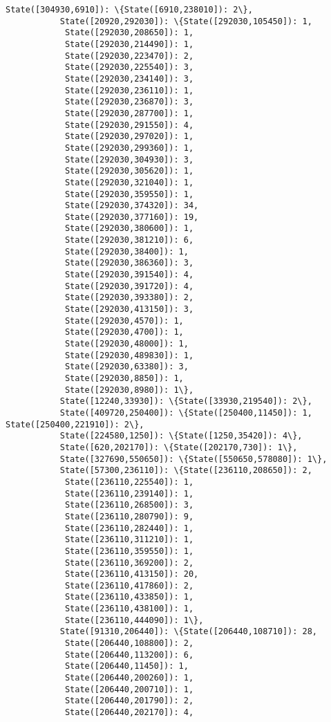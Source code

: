 \documentclass[11pt]{article}
\begin{document}
\begin{Verbatim}[commandchars=\\\{\}]
           State([304930,6910]): \{State([6910,238010]): 2\},
           State([20920,292030]): \{State([292030,105450]): 1,
            State([292030,208650]): 1,
            State([292030,214490]): 1,
            State([292030,223470]): 2,
            State([292030,225540]): 3,
            State([292030,234140]): 3,
            State([292030,236110]): 1,
            State([292030,236870]): 3,
            State([292030,287700]): 1,
            State([292030,291550]): 4,
            State([292030,297020]): 1,
            State([292030,299360]): 1,
            State([292030,304930]): 3,
            State([292030,305620]): 1,
            State([292030,321040]): 1,
            State([292030,359550]): 1,
            State([292030,374320]): 34,
            State([292030,377160]): 19,
            State([292030,380600]): 1,
            State([292030,381210]): 6,
            State([292030,38400]): 1,
            State([292030,386360]): 3,
            State([292030,391540]): 4,
            State([292030,391720]): 4,
            State([292030,393380]): 2,
            State([292030,413150]): 3,
            State([292030,4570]): 1,
            State([292030,4700]): 1,
            State([292030,48000]): 1,
            State([292030,489830]): 1,
            State([292030,63380]): 3,
            State([292030,8850]): 1,
            State([292030,8980]): 1\},
           State([12240,33930]): \{State([33930,219540]): 2\},
           State([409720,250400]): \{State([250400,11450]): 1, State([250400,221910]): 2\},
           State([224580,1250]): \{State([1250,35420]): 4\},
           State([620,202170]): \{State([202170,730]): 1\},
           State([327690,550650]): \{State([550650,578080]): 1\},
           State([57300,236110]): \{State([236110,208650]): 2,
            State([236110,225540]): 1,
            State([236110,239140]): 1,
            State([236110,268500]): 3,
            State([236110,280790]): 9,
            State([236110,282440]): 1,
            State([236110,311210]): 1,
            State([236110,359550]): 1,
            State([236110,369200]): 2,
            State([236110,413150]): 20,
            State([236110,417860]): 2,
            State([236110,433850]): 1,
            State([236110,438100]): 1,
            State([236110,444090]): 1\},
           State([91310,206440]): \{State([206440,108710]): 28,
            State([206440,108800]): 2,
            State([206440,113200]): 6,
            State([206440,11450]): 1,
            State([206440,200260]): 1,
            State([206440,200710]): 1,
            State([206440,201790]): 2,
            State([206440,202170]): 4,

\end{Verbatim}
\end{document}
